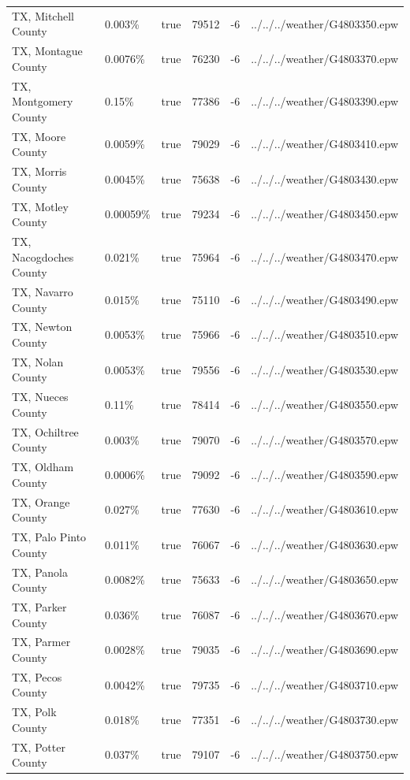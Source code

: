 \begin{longtable}[]{@{}llllll@{}}
TX, Mitchell County & 0.003\% & true & 79512 & -6 &
../../../weather/G4803350.epw \\
TX, Montague County & 0.0076\% & true & 76230 & -6 &
../../../weather/G4803370.epw \\
TX, Montgomery County & 0.15\% & true & 77386 & -6 &
../../../weather/G4803390.epw \\
TX, Moore County & 0.0059\% & true & 79029 & -6 &
../../../weather/G4803410.epw \\
TX, Morris County & 0.0045\% & true & 75638 & -6 &
../../../weather/G4803430.epw \\
TX, Motley County & 0.00059\% & true & 79234 & -6 &
../../../weather/G4803450.epw \\
TX, Nacogdoches County & 0.021\% & true & 75964 & -6 &
../../../weather/G4803470.epw \\
TX, Navarro County & 0.015\% & true & 75110 & -6 &
../../../weather/G4803490.epw \\
TX, Newton County & 0.0053\% & true & 75966 & -6 &
../../../weather/G4803510.epw \\
TX, Nolan County & 0.0053\% & true & 79556 & -6 &
../../../weather/G4803530.epw \\
TX, Nueces County & 0.11\% & true & 78414 & -6 &
../../../weather/G4803550.epw \\
TX, Ochiltree County & 0.003\% & true & 79070 & -6 &
../../../weather/G4803570.epw \\
TX, Oldham County & 0.0006\% & true & 79092 & -6 &
../../../weather/G4803590.epw \\
TX, Orange County & 0.027\% & true & 77630 & -6 &
../../../weather/G4803610.epw \\
TX, Palo Pinto County & 0.011\% & true & 76067 & -6 &
../../../weather/G4803630.epw \\
TX, Panola County & 0.0082\% & true & 75633 & -6 &
../../../weather/G4803650.epw \\
TX, Parker County & 0.036\% & true & 76087 & -6 &
../../../weather/G4803670.epw \\
TX, Parmer County & 0.0028\% & true & 79035 & -6 &
../../../weather/G4803690.epw \\
TX, Pecos County & 0.0042\% & true & 79735 & -6 &
../../../weather/G4803710.epw \\
TX, Polk County & 0.018\% & true & 77351 & -6 &
../../../weather/G4803730.epw \\
TX, Potter County & 0.037\% & true & 79107 & -6 &
../../../weather/G4803750.epw \\

\end{longtable}
